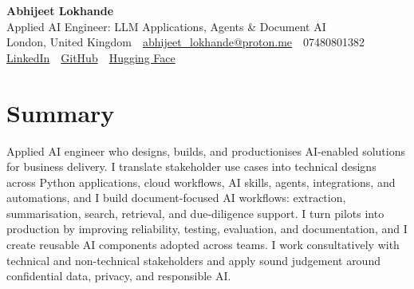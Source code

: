 \documentclass[10pt,a4paper]{article}
\newcommand{\sep}{\,\textcolor{accent!60}{\textbar}\,}
\begin{document}
\begin{center}
  {\fontsize{24}{26}\selectfont\bfseries Abhijeet Lokhande}\\[3pt]
  {\color{accent}\large Applied AI Engineer: LLM Applications, Agents \& Document AI}\\[5pt]
  {\small
    London, United Kingdom \sep
    \href{mailto:abhijeet_lokhande@proton.me}{abhijeet\_lokhande@proton.me} \sep
    07480801382 \\[2pt]
    \href{https://www.linkedin.com/in/ablds/}{LinkedIn} \sep
    \href{https://github.com/abhijeetscode}{GitHub} \sep
    \href{https://huggingface.co/ab-ai}{Hugging Face}
  }
\end{center}
\vspace{2pt}

\section{Summary}
Applied AI engineer who designs, builds, and productionises AI-enabled solutions for business delivery. I translate stakeholder use cases into technical designs across Python applications, cloud workflows, AI skills, agents, integrations, and automations, and I build document-focused AI workflows: extraction, summarisation, search, retrieval, and due-diligence support. I turn pilots into production by improving reliability, testing, evaluation, and documentation, and I create reusable AI components adopted across teams. I work consultatively with technical and non-technical stakeholders and apply sound judgement around confidential data, privacy, and responsible AI.

\end{document}
